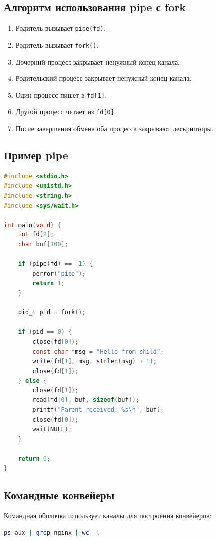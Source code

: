\documentclass[12pt,a4paper]{article}
\begin{document}
\subsection{Алгоритм использования pipe с fork}

\begin{enumerate}
    \item Родитель вызывает \texttt{pipe(fd)}.
    \item Родитель вызывает \texttt{fork()}.
    \item Дочерний процесс закрывает ненужный конец канала.
    \item Родительский процесс закрывает ненужный конец канала.
    \item Один процесс пишет в \texttt{fd[1]}.
    \item Другой процесс читает из \texttt{fd[0]}.
    \item После завершения обмена оба процесса закрывают дескрипторы.
\end{enumerate}

\subsection{Пример pipe}

\begin{lstlisting}[language=C]
#include <stdio.h>
#include <unistd.h>
#include <string.h>
#include <sys/wait.h>

int main(void) {
    int fd[2];
    char buf[100];

    if (pipe(fd) == -1) {
        perror("pipe");
        return 1;
    }

    pid_t pid = fork();

    if (pid == 0) {
        close(fd[0]);
        const char *msg = "Hello from child";
        write(fd[1], msg, strlen(msg) + 1);
        close(fd[1]);
    } else {
        close(fd[1]);
        read(fd[0], buf, sizeof(buf));
        printf("Parent received: %s\n", buf);
        close(fd[0]);
        wait(NULL);
    }

    return 0;
}
\end{lstlisting}

\subsection{Командные конвейеры}

Командная оболочка использует каналы для построения конвейеров:

\begin{lstlisting}[language=bash]
ps aux | grep nginx | wc -l
\end{lstlisting}
\end{document}
